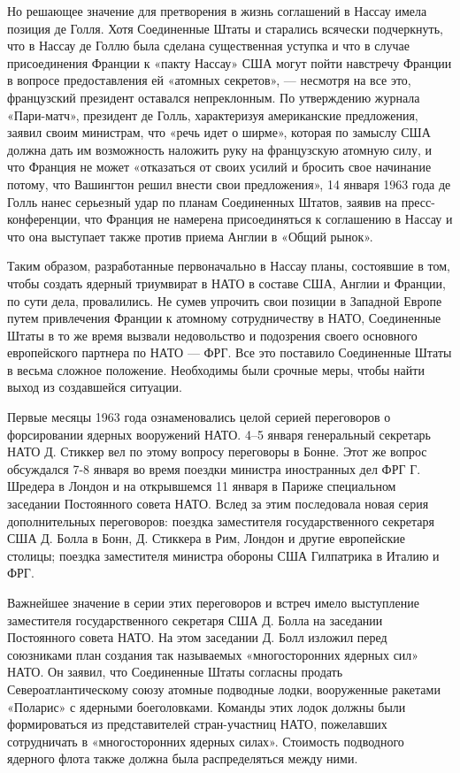 \documentclass[12pt, a4paper, openany]{book}
\begin{document}
Но решающее значение для претворения в жизнь соглашений в Нассау имела позиция де Голля. Хотя Соединенные Штаты и старались всячески подчеркнуть, что в Нассау де Голлю была сделана существенная уступка и что в случае присоединения Франции к «пакту Нассау» США могут пойти навстречу Франции в вопросе предоставления ей «атомных секретов», — несмотря на все это, французский президент оставался непреклонным. По утверждению журнала «Пари-матч», президент де Голль, характеризуя американские предложения, заявил своим министрам, что «речь идет о ширме», которая по замыслу США должна дать им возможность наложить руку на французскую атомную силу, и что Франция не может «отказаться от своих усилий и бросить свое начинание потому, что Вашингтон решил внести свои предложения», 14 января 1963 года де Голль нанес серьезный удар по планам Соединенных Штатов, заявив на пресс-конференции, что Франция не намерена присоединяться к соглашению в Нассау и что она выступает также против приема Англии в «Общий рынок».

Таким образом, разработанные первоначально в Нассау планы, состоявшие в том, чтобы создать ядерный триумвират в НАТО в составе США, Англии и Франции, по сути дела, провалились. Не сумев упрочить свои позиции в Западной Европе путем привлечения Франции к атомному сотрудничеству в НАТО, Соединенные Штаты в то же время вызвали недовольство и подозрения своего основного европейского партнера по НАТО — ФРГ. Все это поставило Соединенные Штаты в весьма сложное положение. Необходимы были срочные меры, чтобы найти выход из создавшейся ситуации.

Первые месяцы 1963 года ознаменовались целой серией переговоров о форсировании ядерных вооружений НАТО. 4–5 января генеральный секретарь НАТО Д. Стиккер вел по этому вопросу переговоры в Бонне. Этот же вопрос обсуждался 7-8 января во время поездки министра иностранных дел ФРГ Г. Шредера в Лондон и на открывшемся 11 января в Париже специальном заседании Постоянного совета НАТО. Вслед за этим последовала новая серия дополнительных переговоров: поездка заместителя государственного секретаря США Д. Болла в Бонн, Д. Стиккера в Рим, Лондон и другие европейские столицы; поездка заместителя министра обороны США Гилпатрика в Италию и ФРГ.

Важнейшее значение в серии этих переговоров и встреч имело выступление заместителя государственного секретаря США Д. Болла на заседании Постоянного совета НАТО. На этом заседании Д. Болл изложил перед союзниками план создания так называемых «многосторонних ядерных сил» НАТО. Он заявил, что Соединенные Штаты согласны продать Североатлантическому союзу атомные подводные лодки, вооруженные ракетами «Поларис» с ядерными боеголовками. Команды этих лодок должны были формироваться из представителей стран-участниц НАТО, пожелавших сотрудничать в «многосторонних ядерных силах». Стоимость подводного ядерного флота также должна была распределяться между ними.
\end{document}
